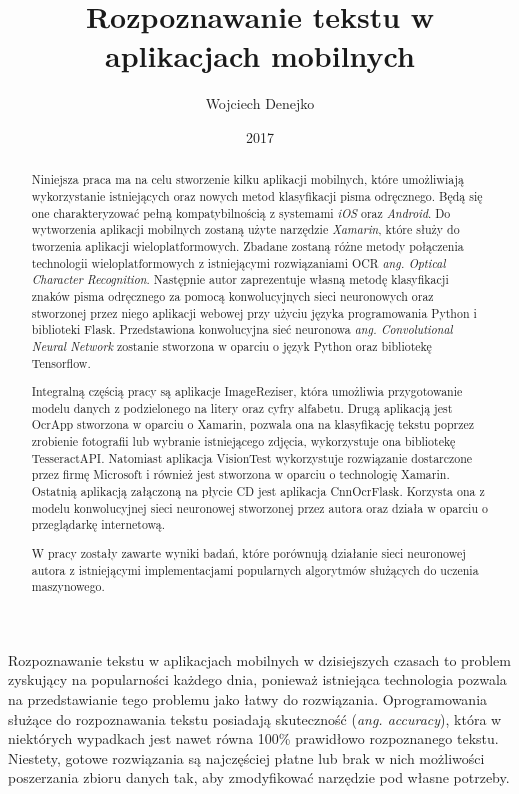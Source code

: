 \documentclass[brudnopis]{xmgr}
\author   {Wojciech Denejko}
\title    {Rozpoznawanie tekstu w aplikacjach mobilnych}
\date     {2017}
\begin{document}
\begin{abstract}
Niniejsza praca ma na celu stworzenie kilku aplikacji mobilnych, które umożliwiają wykorzystanie istniejących oraz nowych metod klasyfikacji pisma odręcznego. Będą się one charakteryzować pełną kompatybilnością z systemami \emph{iOS} oraz \emph{Android}. Do wytworzenia aplikacji mobilnych zostaną użyte narzędzie \emph{Xamarin}, które służy do tworzenia aplikacji wieloplatformowych. Zbadane zostaną różne metody połączenia technologii wieloplatformowych z istniejącymi rozwiązaniami OCR \emph{ang. Optical Character Recognition}. Następnie autor zaprezentuje własną metodę klasyfikacji znaków pisma odręcznego za pomocą konwolucyjnych sieci neuronowych oraz stworzonej przez niego aplikacji webowej przy użyciu języka programowania Python i biblioteki Flask. Przedstawiona konwolucyjna sieć neuronowa \emph{ang. Convolutional Neural Network} zostanie stworzona w oparciu o język Python oraz bibliotekę Tensorflow.

Integralną częścią pracy są aplikacje ImageReziser, która umożliwia przygotowanie modelu danych z podzielonego na litery oraz cyfry alfabetu. Drugą aplikacją jest OcrApp stworzona w oparciu o Xamarin, pozwala ona na klasyfikację tekstu poprzez zrobienie fotografii lub wybranie istniejącego zdjęcia, wykorzystuje ona bibliotekę TesseractAPI. Natomiast aplikacja VisionTest wykorzystuje rozwiązanie dostarczone przez firmę Microsoft i również jest stworzona w oparciu o technologię Xamarin. Ostatnią aplikacją załączoną na płycie CD jest aplikacja CnnOcrFlask. Korzysta ona z modelu konwolucyjnej sieci neuronowej stworzonej przez autora oraz działa w oparciu o przeglądarkę internetową. 

W pracy zostały zawarte wyniki badań, które porównują działanie sieci neuronowej autora z istniejącymi implementacjami popularnych algorytmów służących do uczenia maszynowego. 
  
\end{abstract}


\maketitle

\introduction
	Rozpoznawanie tekstu w aplikacjach mobilnych w dzisiejszych czasach to problem zyskujący na popularności każdego dnia, ponieważ istniejąca technologia pozwala na przedstawianie tego problemu jako łatwy do rozwiązania. Oprogramowania służące do rozpoznawania tekstu posiadają skuteczność (\emph{ang. accuracy}), która w niektórych wypadkach jest nawet równa 100\% prawidłowo rozpoznanego tekstu. Niestety, gotowe rozwiązania są najczęściej płatne lub brak w nich możliwości poszerzania zbioru danych tak, aby zmodyfikować narzędzie pod własne potrzeby.
	
\end{document}
